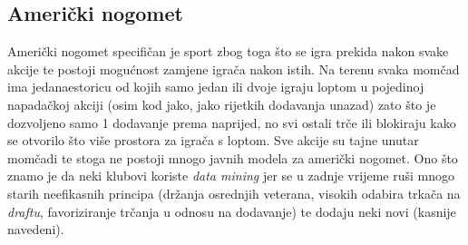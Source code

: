 \documentclass{ferseminar}
\begin{document}
\subsection{Američki nogomet}
Američki nogomet specifičan je sport zbog toga što se igra prekida nakon svake akcije te postoji mogućnost zamjene igrača nakon istih. Na terenu svaka momčad ima jedanaestoricu od kojih samo jedan ili dvoje igraju loptom u pojedinoj napadačkoj akciji (osim kod jako, jako rijetkih dodavanja unazad) zato što je dozvoljeno samo 1 dodavanje prema naprijed, no svi ostali trče ili blokiraju kako se otvorilo što više prostora za igrača s loptom. Sve akcije su tajne unutar momčadi te stoga ne postoji mnogo javnih modela za američki nogomet. Ono što znamo je da neki klubovi koriste \textit{data mining} jer se u zadnje vrijeme ruši mnogo starih neefikasnih principa (držanja osrednjih veterana,
\newpage\noindent visokih odabira trkača na \textit{draftu}, favoriziranje trčanja u odnosu na dodavanje) te dodaju neki novi (kasnije navedeni).
\end{document}
